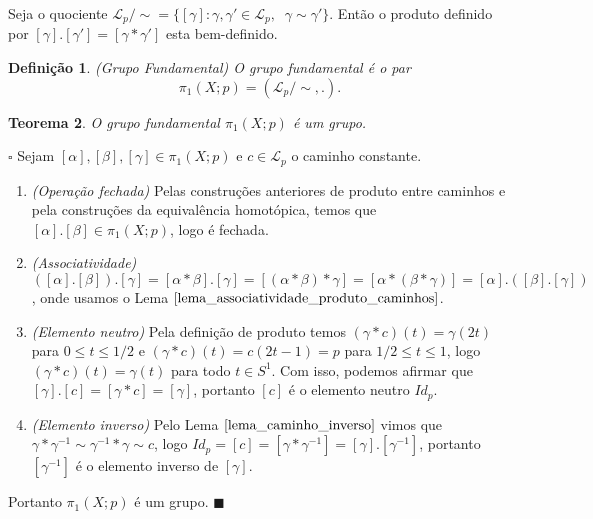 \documentclass[12pt]{book}
\newtheorem{teorema}{Teorema}[section]
\newtheorem{definicao}[teorema]{Definição}
\newenvironment{prova}[1]{$\square$ #1}{\hfill$\blacksquare$}
\newcommand{\caminhospontobase}[1]{\mathcal{L}_{#1}}
\newcommand{\circulo}{S^{1}}
\newcommand{\classe}[1]{[#1]}
\newcommand{\grupofundamentalpontobase}[2]{\pi_{1}(#1; #2)}
\begin{document}
	Seja o quociente $\caminhospontobase{p}/\sim = \{ \classe{\gamma} : \gamma,\gamma' \in \caminhospontobase{p},\;\;\gamma \sim \gamma'\}$. Então o produto definido por $\classe{\gamma}.\classe{\gamma'} = \classe{\gamma*\gamma'}$ esta bem-definido.
	
	\begin{definicao}
		(Grupo Fundamental) O grupo fundamental é o par 
		$$
		\grupofundamentalpontobase{X}{p} = (\caminhospontobase{p}/\sim, .).
		$$
	\end{definicao}
	
	\begin{teorema}
		O grupo fundamental $\grupofundamentalpontobase{X}{p}$ é um grupo.
	\end{teorema}
	\begin{prova}
		Sejam $\classe{\alpha}, \classe{\beta}, \classe{\gamma} \in  \grupofundamentalpontobase{X}{p}$ e $c\in \caminhospontobase{p}$ o caminho constante.
		\begin{enumerate}
			\item \textit{(Operação fechada)} Pelas construções anteriores de produto entre caminhos e pela construções da equivalência homotópica, temos que $\classe{\alpha}.\classe{\beta} \in \grupofundamentalpontobase{X}{p}$, logo é fechada.
			\item \textit{(Associatividade)} $(\classe{\alpha}. \classe{\beta}). \classe{\gamma} = \classe{\alpha*\beta}. \classe{\gamma} = \classe{(\alpha*\beta)*\gamma} = \classe{\alpha*(\beta*\gamma)} = \classe{\alpha}. (\classe{\beta}. \classe{\gamma} )$, onde usamos o Lema $\ref{lema_associatividade_produto_caminhos}$.
			\item \textit{(Elemento neutro)} Pela definição de produto temos $(\gamma*c)(t) = \gamma(2t)$ para $0\leq t \leq 1/2$ e  $(\gamma*c)(t) = c(2t-1) = p$ para $1/2 \leq t \leq 1$, logo $(\gamma*c)(t) = \gamma(t)$ para todo $t \in \circulo$. Com isso, podemos afirmar que $\classe{\gamma}.\classe{c} = \classe{\gamma*c} = \classe{\gamma}$, portanto $\classe{c}$ é o elemento neutro $Id_{p}$.
			\item \textit{(Elemento inverso)} Pelo Lema $\ref{lema_caminho_inverso}$ vimos que $\gamma *\gamma^{-1} \sim \gamma^{-1} *\gamma \sim c$, logo $Id_{p} =\classe{c} =  \classe{\gamma*\gamma^{-1}} = \classe{\gamma}.\classe{\gamma^{-1}}$, portanto $\classe{\gamma^{-1}}$ é o elemento inverso de $\classe{\gamma}$.
		\end{enumerate}
		Portanto $\grupofundamentalpontobase{X}{p}$ é um grupo.
	\end{prova}
	
\end{document}

